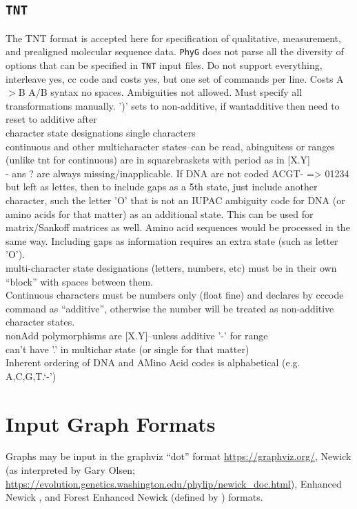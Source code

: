 \documentclass[11pt]{article}
\begin{document}
		\subsection{\texttt{TNT}}
		The TNT \citep{Goloboffetal2008} format is accepted here for specification of qualitative, measurement, and prealigned molecular 
		sequence data.  \texttt{PhyG} does not parse all the diversity of options that can be specified in \texttt{TNT} input files.
		Do not support everything, interleave yes, cc code and costs yes, but one set of commands per line.
		Costs A$>$B A$/$B syntax no spaces. Ambiguities not allowed.  Must specify all transformations manually.
		')' sets to non-additive, if wantadditive then need to reset to additive after\\
		character state designations single characters\\
		continuous and other multicharacter states--can be read, abinguitess or ranges (unlike tnt for continuous) are 
		in squarebraskets with period as in [X.Y]\\
		- ans ? are always missing/inapplicable.  If DNA are not coded ACGT- => 01234 but left as lettes,
		then to include gaps as a 5th state, just include another character, such the letter 'O' that is not an IUPAC ambiguity code for DNA (or amino acids for that matter) as an additional state.  This can be used for matrix/Sankoff matrices as well.
		Amino acid sequences would be processed in the same way.  Including gaps as information requires
		an extra state (such as letter 'O').\\ 
		multi-character state designations (letters, numbers, etc) must be in their own ``block'' with spaces 
		between them.\\
		Continuous characters must be numbers only (float fine) and declares by cccode command as 
		``additive'', otherwise the number will be treated as non-additive character states. \\
		nonAdd polymorphisms  are [X.Y]--unless  additive '-' for range\\
		can't have '.' in multichar state (or single for that matter)\\
		Inherent ordering of DNA and AMino Acid codes is alphabetical (e.g. A,C,G,T.`-')
	
	\section{Input Graph Formats}
	Graphs may be input in the graphviz ``dot'' format \url{https://graphviz.org/}, Newick (as interpreted by Gary Olsen; \url{https://evolution.genetics.washington.edu/phylip/newick_doc.html}), Enhanced Newick \cite{Cardonaetal2008},
	and Forest Enhanced Newick (defined by \citealp{WheelerPhyloSuperGraphs}) formats.
	
\end{document}
